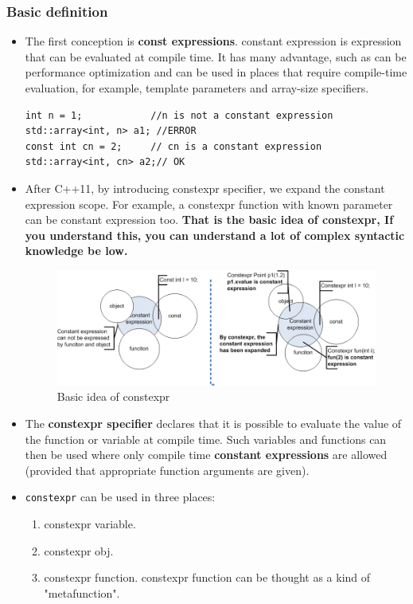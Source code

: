 \documentclass[a4paper,11pt,twoside]{book}
\begin{document}
\subsubsection{Basic definition}
\begin{itemize}
	\item The first conception is \textbf{const expressions}. constant expression is expression that can be evaluated at compile time. It has many advantage, such as can be performance optimization and can be used in places that require compile-time evaluation, for example, template parameters and array-size specifiers.
\begin{lstlisting}
int n = 1;            //n is not a constant expression
std::array<int, n> a1; //ERROR 
const int cn = 2;     // cn is a constant expression
std::array<int, cn> a2;// OK 
\end{lstlisting}

	\item After C++11, by introducing constexpr specifier, we expand the constant expression scope. For example, a constexpr function with known parameter can be constant expression too. \textbf{That is the basic idea of constexpr, If you understand this, you can understand a lot of complex syntactic knowledge be low.}
	\begin{figure}[h]
		\centering
		\includegraphics[width=0.9\linewidth]{pics/constexpr.png}
		\caption{Basic idea of constexpr}
		\label{fig:constexpr}
	\end{figure}
	
	\item The \textbf{constexpr specifier} declares that it is possible to evaluate the value of the function or variable at compile time. Such variables and functions can then be used where only compile time \textbf{constant expressions} are allowed (provided that appropriate function arguments are given). 

	\item \texttt{constexpr} can be used in three places: 
\begin{enumerate}
	\item constexpr variable.
	\item constexpr obj.
	\item constexpr function. constexpr function can be thought as a kind of "metafunction".
\end{enumerate}


\end{itemize}
\end{document}
